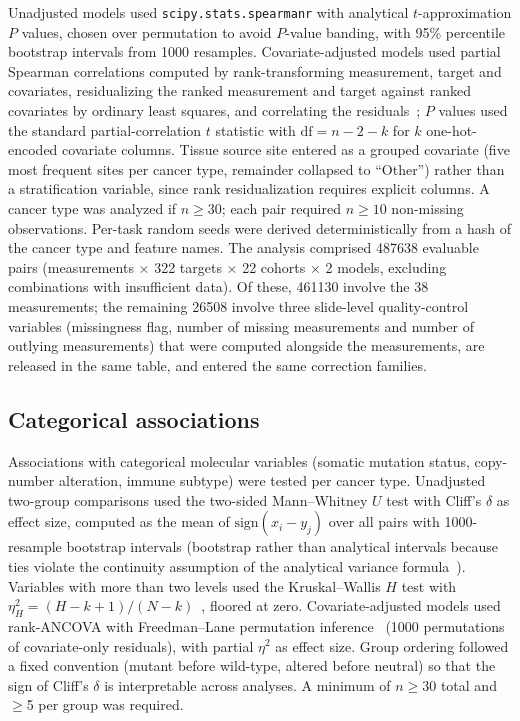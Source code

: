 Unadjusted models used \texttt{scipy.stats.spearmanr} with analytical
$t$-approximation $P$ values, chosen over permutation to avoid $P$-value banding,
with 95\% percentile bootstrap intervals from \num{1000} resamples.
Covariate-adjusted models used partial Spearman correlations computed by
rank-transforming measurement, target and covariates, residualizing the ranked
measurement and target against ranked covariates by ordinary least squares, and
correlating the residuals~\cite{conover1999}; $P$ values used the standard
partial-correlation $t$ statistic with $\mathrm{df} = n - 2 - k$ for $k$
one-hot-encoded covariate columns. Tissue source site entered as a grouped
covariate (five most frequent sites per cancer type, remainder collapsed to
``Other'') rather than a stratification variable, since rank residualization
requires explicit columns. A cancer type was analyzed if $n \geq 30$; each pair
required $n \geq 10$ non-missing observations. Per-task random seeds were derived
deterministically from a hash of the cancer type and feature names. The analysis
comprised \num{487638} evaluable pairs (measurements $\times$ 322 targets
$\times$ 22 cohorts $\times$ 2 models, excluding combinations with insufficient
data). Of these, \num{461130} involve the 38 measurements; the remaining
\num{26508} involve three slide-level quality-control variables (missingness
flag, number of missing measurements and number of outlying measurements) that
were computed alongside the measurements, are released in the same table, and
entered the same correction families.

\subsection{Categorical associations}
\label{sec:methods:categorical}

Associations with categorical molecular variables (somatic mutation status,
copy-number alteration, immune subtype) were tested per cancer type. Unadjusted
two-group comparisons used the two-sided Mann--Whitney $U$ test with Cliff's
$\delta$ as effect size, computed as the mean of $\mathrm{sign}(x_i - y_j)$ over
all pairs with \num{1000}-resample bootstrap intervals (bootstrap rather than
analytical intervals because ties violate the continuity assumption of the
analytical variance formula~\cite{cliff1993}). Variables with more than two
levels used the Kruskal--Wallis $H$ test with
$\eta^2_H = (H - k + 1)/(N - k)$~\cite{tomczak2014}, floored at zero.
Covariate-adjusted models used rank-ANCOVA with Freedman--Lane permutation
inference~\cite{freedmanlane1983} (\num{1000} permutations of covariate-only
residuals), with partial $\eta^2$ as effect size. Group ordering followed a fixed
convention (mutant before wild-type, altered before neutral) so that the sign of
Cliff's $\delta$ is interpretable across analyses. A minimum of $n \geq 30$ total
and $\geq$5 per group was required.

